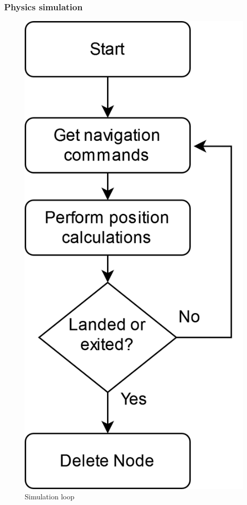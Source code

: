 \documentclass{article}
\begin{document}
\subsubsection{Physics simulation}
\begin{figure}[H]
\centering
\includegraphics{diagrams/flowcharts/aeroplanesimulationprocess.png}
\caption{\label{fig:physics}Simulation loop}
\end{figure}
\end{document}
